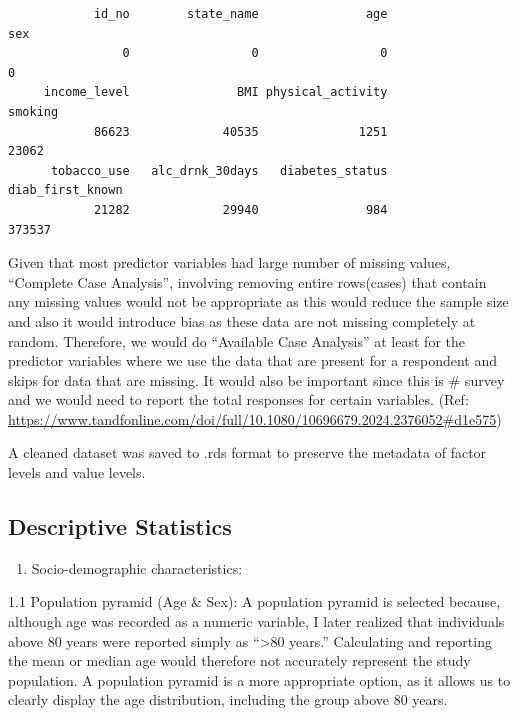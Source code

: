 \documentclass[
  letterpaper,
  DIV=11,
  numbers=noendperiod]{scrartcl}
\providecommand{\tightlist}{%
  \setlength{\itemsep}{0pt}\setlength{\parskip}{0pt}}\usepackage{longtable,booktabs,array}
\begin{document}
\begin{verbatim}
            id_no        state_name               age               sex 
                0                 0                 0                 0 
     income_level               BMI physical_activity           smoking 
            86623             40535              1251             23062 
      tobacco_use   alc_drnk_30days   diabetes_status  diab_first_known 
            21282             29940               984            373537 
\end{verbatim}

Given that most predictor variables had large number of missing values,
``Complete Case Analysis'', involving removing entire rows(cases) that
contain any missing values would not be appropriate as this would reduce
the sample size and also it would introduce bias as these data are not
missing completely at random. Therefore, we would do ``Available Case
Analysis'' at least for the predictor variables where we use the data
that are present for a respondent and skips for data that are missing.
It would also be important since this is \# survey and we would need to
report the total responses for certain variables. (Ref:
\url{https://www.tandfonline.com/doi/full/10.1080/10696679.2024.2376052\#d1e575})

A cleaned dataset was saved to .rds format to preserve the metadata of
factor levels and value levels.

\subsection{Descriptive Statistics}\label{descriptive-statistics}

\begin{enumerate}
\def\labelenumi{\arabic{enumi}.}
\tightlist
\item
  Socio-demographic characteristics:
\end{enumerate}

1.1 Population pyramid (Age \& Sex): A population pyramid is selected
because, although age was recorded as a numeric variable, I later
realized that individuals above 80 years were reported simply as
``\textgreater80 years.'' Calculating and reporting the mean or median
age would therefore not accurately represent the study population. A
population pyramid is a more appropriate option, as it allows us to
clearly display the age distribution, including the group above 80
years.
\end{document}

